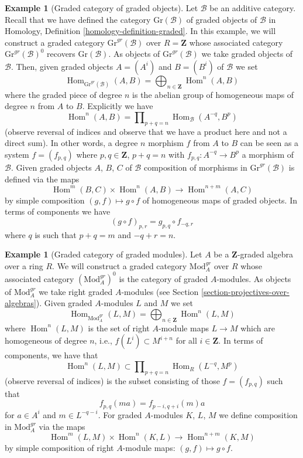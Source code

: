 \documentclass{stacks-project}
\theoremstyle{plain}
\theoremstyle{definition}
\newtheorem{example}[subsection]{Example}
\theoremstyle{remark}
\numberwithin{equation}{subsection}
\def\Hom{\mathop{\mathrm{Hom}}\nolimits}
\begin{document}
\begin{example}[Graded category of graded objects]
\label{example-graded-category-graded-objects}
Let $\mathcal{B}$ be an additive category. Recall that we have defined
the category $\text{Gr}(\mathcal{B})$ of graded objects of $\mathcal{B}$ in
Homology, Definition \ref{homology-definition-graded}.
In this example, we will construct a graded category
$\text{Gr}^{gr}(\mathcal{B})$ over $R = \mathbf{Z}$
whose associated category $\text{Gr}^{gr}(\mathcal{B})^0$
recovers $\text{Gr}(\mathcal{B})$.
As objects of $\text{Gr}^{gr}(\mathcal{B})$
we take graded objects of $\mathcal{B}$. Then, given graded objects
$A = (A^i)$ and $B = (B^i)$ of $\mathcal{B}$ we set
$$
\Hom_{\text{Gr}^{gr}(\mathcal{B})}(A, B) =
\bigoplus\nolimits_{n \in \mathbf{Z}} \Hom^n(A, B)
$$
where the graded piece of degree $n$ is the abelian group of homogeneous
maps of degree $n$ from $A$ to $B$. Explicitly we have
$$
\Hom^n(A, B) = \prod\nolimits_{p + q = n} \Hom_\mathcal{B}(A^{-q}, B^p)
$$
(observe reversal of indices and observe that we have a product here and
not a direct sum). In other words, a degree $n$ morphism $f$
from $A$ to $B$ can be seen as a system $f = (f_{p, q})$ where
$p, q \in \mathbf{Z}$, $p + q = n$ with
$f_{p, q} : A^{-q} \to B^p$ a morphism of $\mathcal{B}$.
Given graded objects $A$, $B$, $C$ of $\mathcal{B}$
composition of morphisms in $\text{Gr}^{gr}(\mathcal{B})$ is defined
via the maps
$$
\Hom^m(B, C) \times \Hom^n(A, B) \longrightarrow \Hom^{n + m}(A, C)
$$
by simple composition $(g, f) \mapsto g \circ f$ of homogeneous
maps of graded objects. In terms of components we have
$$
(g \circ f)_{p, r} = g_{p, q} \circ f_{-q, r}
$$
where $q$ is such that $p + q = m$ and $-q + r = n$.
\end{example}

\begin{example}[Graded category of graded modules]
\label{example-gm-gr-cat}
Let $A$ be a $\mathbf{Z}$-graded algebra over a ring $R$. We will construct
a graded category $\text{Mod}^{gr}_A$ over $R$ whose associated category
$(\text{Mod}^{gr}_A)^0$ is the category of graded $A$-modules. As objects
of $\text{Mod}^{gr}_A$ we take right graded $A$-modules (see
Section \ref{section-projectives-over-algebras}). Given graded
$A$-modules $L$ and $M$ we set
$$
\Hom_{\text{Mod}^{gr}_A}(L, M) =
\bigoplus\nolimits_{n \in \mathbf{Z}} \Hom^n(L, M)
$$
where $\Hom^n(L, M)$ is the set of right $A$-module maps $L \to M$ which
are homogeneous of degree $n$, i.e., $f(L^i) \subset M^{i + n}$ for
all $i \in \mathbf{Z}$. In terms of components, we have that
$$
\Hom^n(L, M) \subset \prod\nolimits_{p + q = n} \Hom_R(L^{-q}, M^p)
$$
(observe reversal of indices) is the subset consisting of those
$f = (f_{p, q})$ such that
$$
f_{p, q}(m a) = f_{p - i, q + i}(m)a
$$
for $a \in A^i$ and $m \in L^{-q - i}$. For graded $A$-modules
$K$, $L$, $M$ we define composition in $\text{Mod}^{gr}_A$ via
the maps
$$
\Hom^m(L, M) \times \Hom^n(K, L) \longrightarrow \Hom^{n + m}(K, M)
$$
by simple composition of right $A$-module maps: $(g, f) \mapsto g \circ f$.
\end{example}
\end{document}

